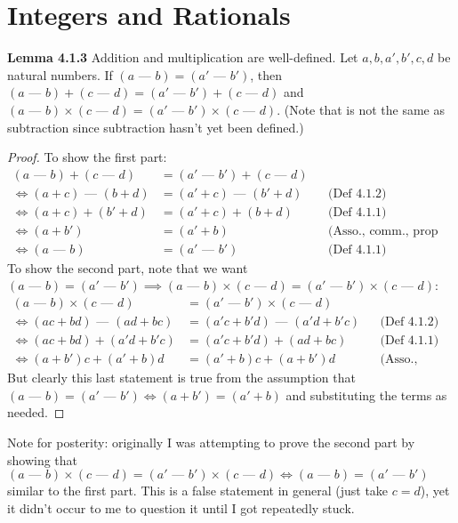 \documentclass[answers,12pt]{exam}
\newcommand{\fakeminus}{\text{ --- }}
\begin{document}
\section{Integers and Rationals}
\textbf{Lemma 4.1.3} Addition and multiplication are well-defined.
Let $a,b,a',b',c,d$ be natural numbers.
If $(a \fakeminus b)=(a' \fakeminus b')$, then $(a \fakeminus b)+(c \fakeminus d)=(a' \fakeminus b')+(c \fakeminus d)$ and $(a \fakeminus b)\times(c \fakeminus d)=(a' \fakeminus b')\times(c \fakeminus d)$.
(Note that \fakeminus{} is not the same as subtraction since subtraction hasn't yet been defined.)

\begin{solution}
\begin{proof}
    To show the first part:
    \begin{align*}
        (a \fakeminus b) + (c \fakeminus d) &= (a' \fakeminus b') + (c \fakeminus d)\\
        \iff (a+c) \fakeminus (b+d) &= (a' + c) \fakeminus (b' + d) && \text{(Def 4.1.2)}\\
        \iff (a+c) + (b'+d) &= (a' + c) + (b + d)  && \text{(Def 4.1.1)}\\
        \iff (a+b') &= (a'+b)  && \text{(Asso., comm., prop 2.2.6)}\\
        \iff (a \fakeminus b) &= (a' \fakeminus b')  && \text{(Def 4.1.1)}
    \end{align*}
    To show the second part, note that we want $(a \fakeminus b) = (a' \fakeminus b') \implies (a \fakeminus b) \times (c \fakeminus d)  = (a' \fakeminus b') \times (c \fakeminus d)$:
    \begin{align*}
        (a \fakeminus b) \times (c \fakeminus d) &= (a' \fakeminus b') \times (c \fakeminus d) \\
        \iff (ac + bd) \fakeminus (ad + bc) &= (a'c + b'd) \fakeminus (a'd + b'c)&& \text{(Def 4.1.2)} \\
        \iff (ac + bd) + (a'd + b'c) &= (a'c + b'd) + (ad + bc) && \text{(Def 4.1.1)}\\
        \iff (a+b')c + (a'+b)d &= (a'+b)c + (a+b')d && \text{(Asso., comm., dist.)}
    \end{align*}
    But clearly this last statement is true from the assumption that $(a \fakeminus b) = (a' \fakeminus b') \iff (a + b') = (a' + b)$ and substituting the terms as needed.
\end{proof}

Note for posterity: originally I was attempting to prove the second part by showing that $(a \fakeminus b) \times (c \fakeminus d) = (a' \fakeminus b') \times (c \fakeminus d) \iff (a \fakeminus b) = (a' \fakeminus b')$ similar to the first part.
This is a false statement in general (just take $c = d$), yet it didn't occur to me to question it until I got repeatedly stuck.
\end{solution}
\end{document}

